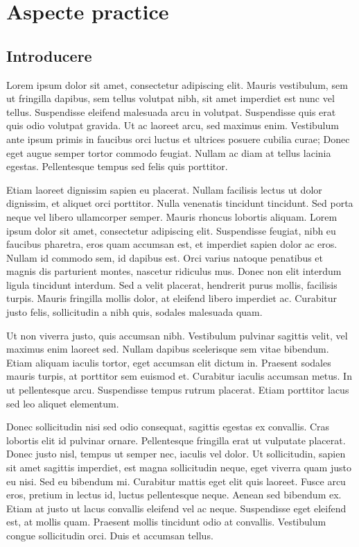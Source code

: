 \chapter{Aspecte practice \label{practica}}
\section{Introducere}


Lorem ipsum dolor sit amet, consectetur adipiscing elit. Mauris vestibulum, sem ut fringilla dapibus, sem tellus volutpat nibh, sit amet imperdiet est nunc vel tellus. Suspendisse eleifend malesuada arcu in volutpat. Suspendisse quis erat quis odio volutpat gravida. Ut ac laoreet arcu, sed maximus enim. Vestibulum ante ipsum primis in faucibus orci luctus et ultrices posuere cubilia curae; Donec eget augue semper tortor commodo feugiat. Nullam ac diam at tellus lacinia egestas. Pellentesque tempus sed felis quis porttitor.

Etiam laoreet dignissim sapien eu placerat. Nullam facilisis lectus ut dolor dignissim, et aliquet orci porttitor. Nulla venenatis tincidunt tincidunt. Sed porta neque vel libero ullamcorper semper. Mauris rhoncus lobortis aliquam. Lorem ipsum dolor sit amet, consectetur adipiscing elit. Suspendisse feugiat, nibh eu faucibus pharetra, eros quam accumsan est, et imperdiet sapien dolor ac eros. Nullam id commodo sem, id dapibus est. Orci varius natoque penatibus et magnis dis parturient montes, nascetur ridiculus mus. Donec non elit interdum ligula tincidunt interdum. Sed a velit placerat, hendrerit purus mollis, facilisis turpis. Mauris fringilla mollis dolor, at eleifend libero imperdiet ac. Curabitur justo felis, sollicitudin a nibh quis, sodales malesuada quam.

Ut non viverra justo, quis accumsan nibh. Vestibulum pulvinar sagittis velit, vel maximus enim laoreet sed. Nullam dapibus scelerisque sem vitae bibendum. Etiam aliquam iaculis tortor, eget accumsan elit dictum in. Praesent sodales mauris turpis, at porttitor sem euismod et. Curabitur iaculis accumsan metus. In ut pellentesque arcu. Suspendisse tempus rutrum placerat. Etiam porttitor lacus sed leo aliquet elementum.

Donec sollicitudin nisi sed odio consequat, sagittis egestas ex convallis. Cras lobortis elit id pulvinar ornare. Pellentesque fringilla erat ut vulputate placerat. Donec justo nisl, tempus ut semper nec, iaculis vel dolor. Ut sollicitudin, sapien sit amet sagittis imperdiet, est magna sollicitudin neque, eget viverra quam justo eu nisi. Sed eu bibendum mi. Curabitur mattis eget elit quis laoreet. Fusce arcu eros, pretium in lectus id, luctus pellentesque neque. Aenean sed bibendum ex. Etiam at justo ut lacus convallis eleifend vel ac neque. Suspendisse eget eleifend est, at mollis quam. Praesent mollis tincidunt odio at convallis. Vestibulum congue sollicitudin orci. Duis et accumsan tellus.

